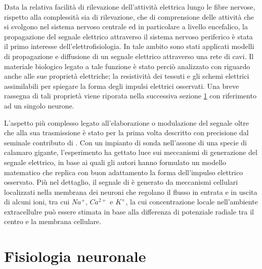 Data la relativa facilità di rilevazione dell'attività elettrica lungo le fibre nervose, rispetto alla complessità sia di rilevazione, che di comprensione delle attività che si svolgono nel sistema nervoso centrale ed in particolare a livello encefalico, la propagazione del segnale elettrico attraverso il sistema nervoso periferico è stata il primo interesse dell'elettrofisiologia. In tale ambito sono stati applicati modelli di propagazione e diffusione di un segnale elettrico attraverso una rete di cavi. Il materiale biologico legato a tale funzione è stato perciò analizzato con riguardo anche alle sue proprietà elettriche; la resistività dei tessuti e gli schemi elettrici assimilabili per spiegare la forma degli impulsi elettrici osservati. Una breve rassegna di tali proprietà viene riporata nella successiva sezione \ref{sez:Fisiologia} con riferimento ad un singolo neurone.

L'aspetto più complesso legato all'elaborazione o modulazione del segnale oltre che alla sua trasmissione è stato per la prima volta descritto con precisione dal seminale contributo di \cite{Hodgkin1952}. Con un impianto di sonda nell'assone di una specie di calamaro gigante, l'esperimento ha gettato luce sui meccanismi di generazione del segnale elettrico, in base ai quali gli autori hanno formulato un modello matematico che replica con buon adattamento la forma dell'impulso elettrico osservato. Più nel dettaglio, il segnale di \cite{Hodgkin1952} è generato da meccanismi cellulari localizzati nella membrana dei neuroni che regolano il flusso in entrata e in uscita di alcuni ioni, tra cui $Na^{+}$, $Ca^{2+}$ e $K^{+}$, la cui concentrazione locale nell'ambiente extracellulre può essere stimata in base alla differenza di potenziale radiale tra il centro e la membrana cellulare.



\section{Fisiologia neuronale}
\label{sez:Fisiologia}

